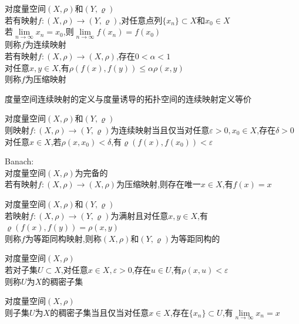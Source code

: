\begin{dingyi}
对度量空间$(X,\rho)$和$(Y,\varrho)$\\
若有映射$f:(X,\rho)\to(Y,\varrho)$,对任意点列$\{x_n\}\subset X$和$x_0\in X$\\
若$\lim\limits_{n\to\infty}x_n=x_0$,则$\lim\limits_{n\to\infty}f(x_n)=f(x_0)$\\
则称$f$为连续映射\\
若有映射$f:(X,\rho)\to(X,\rho)$,存在$0<\alpha<1$\\
对任意$x,y\in X$,有$\rho(f(x),f(y))\leq \alpha\rho(x,y)$\\
则称$f$为压缩映射
\end{dingyi}

\begin{zhu}
度量空间连续映射的定义与度量诱导的拓扑空间的连续映射定义等价
\end{zhu}

\begin{dingli}
对度量空间$(X,\rho)$和$(Y,\varrho)$\\
则映射$f:(X,\rho)\to(Y,\varrho)$为连续映射当且仅当对任意$\varepsilon>0,x_0\in X$,存在$\delta>0$\\
对任意$x\in X$,若$\rho(x,x_0)<\delta$,有$\varrho(f(x),f(x_0))<\varepsilon$
\end{dingli}

\begin{dingli}
Banach:\\
对度量空间$(X,\rho)$为完备的\\
若有映射$f:(X,\rho)\to(X,\rho)$为压缩映射,则存在唯一$x\in X$,有$f(x)=x$
\end{dingli}

\begin{dingyi}
对度量空间$(X,\rho)$和$(Y,\varrho)$\\
若映射$f:(X,\rho)\to(Y,\varrho)$为满射且对任意$x,y\in X$,有$\varrho(f(x),f(y))=\rho(x,y)$\\
则称$f$为等距同构映射,则称$(X,\rho)$和$(Y,\varrho)$为等距同构的
\end{dingyi}

\begin{dingyi}
对度量空间$(X,\rho)$\\
若对子集$U\subset X$,对任意$x\in X,\varepsilon>0$,存在$u\in U$,有$\rho(x,u)<\varepsilon$\\
则称$U$为$X$的稠密子集
\end{dingyi}

\begin{dingli}
对度量空间$(X,\rho)$\\
则子集$U$为$X$的稠密子集当且仅当对任意$x\in X$,存在$\{x_n\}\subset U$,有$\lim\limits_{n\to\infty}x_n=x$
\end{dingli}

